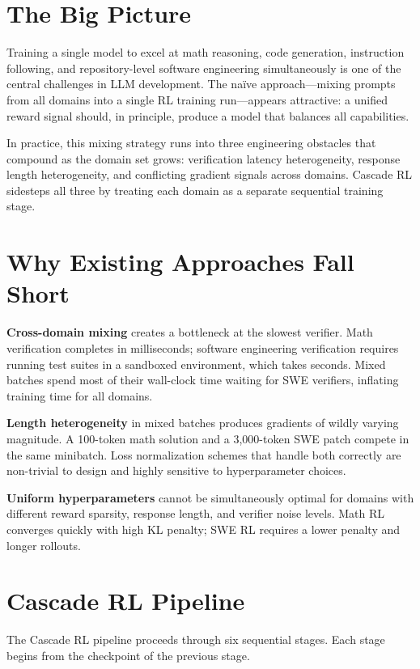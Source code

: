 \documentclass[10pt,twocolumn]{article}
\begin{document}
\section{The Big Picture}

Training a single model to excel at math reasoning, code generation, instruction following, and repository-level software engineering simultaneously is one of the central challenges in LLM development.
The na\"ive approach---mixing prompts from all domains into a single RL training run---appears attractive: a unified reward signal should, in principle, produce a model that balances all capabilities.

In practice, this mixing strategy runs into three engineering obstacles that compound as the domain set grows:
verification latency heterogeneity, response length heterogeneity, and conflicting gradient signals across domains.
Cascade RL sidesteps all three by treating each domain as a separate sequential training stage.

\section{Why Existing Approaches Fall Short}

\textbf{Cross-domain mixing} creates a bottleneck at the slowest verifier.
Math verification completes in milliseconds; software engineering verification requires running test suites in a sandboxed environment, which takes seconds.
Mixed batches spend most of their wall-clock time waiting for SWE verifiers, inflating training time for all domains.

\textbf{Length heterogeneity} in mixed batches produces gradients of wildly varying magnitude.
A 100-token math solution and a 3,000-token SWE patch compete in the same minibatch.
Loss normalization schemes that handle both correctly are non-trivial to design and highly sensitive to hyperparameter choices.

\textbf{Uniform hyperparameters} cannot be simultaneously optimal for domains with different reward sparsity, response length, and verifier noise levels.
Math RL converges quickly with high KL penalty; SWE RL requires a lower penalty and longer rollouts.

\section{Cascade RL Pipeline}

The Cascade RL pipeline proceeds through six sequential stages.
Each stage begins from the checkpoint of the previous stage.
\end{document}
